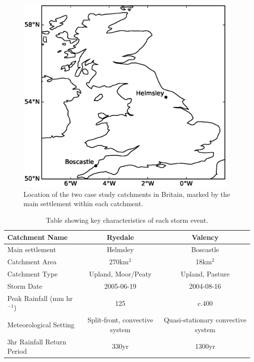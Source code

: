 \begin{figure}[htb]
\includegraphics[width=11cm]{chp_events_figures_scripts/figure_location_map.eps}
\caption{Location of the two case study catchments in Britain, marked by the main settlement within each catchment.}
\label{fig_location_map}
\end{figure}

\linespread{1.5}
\begin{table}
\resizebox{\textwidth}{!}
{%
\begin{tabular}{l c c} \hline

Catchment Name 			& \textbf{Ryedale} &  \textbf{Valency} \\ \hline
Main settlement        & Helmsley             & Boscastle \\
Catchment Area   			& 270km$^2$ 				& 18km$^2$ \\ 
Catchment Type         & Upland, Moor/Peaty & Upland, Pasture \\ 
Storm Date	 		            & 2005-06-19 	& 2004-08-16 \\ 
Peak Rainfall	 (mm hr \(^{-1}\))  & 125  & c.400 \\
Meteorological Setting	 	& Split-front, convective system & Quasi-stationary convective system \\ 
3hr Rainfall Return Period 	 & 330yr \citep{wass2008investigation}	& 1300yr \citep{burt2005cloudburst} \\ \hline
\end{tabular}
}
\caption{Table showing key characteristics of each storm event.}
\label{table_met_setting}
\end{table}


